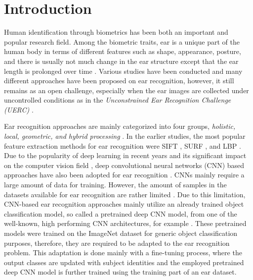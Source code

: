 \documentclass[11pt,journal,compsoc]{IEEEtran}
\begin{document}
\IEEEdisplaynotcompsoctitleabstractindextext

\IEEEpeerreviewmaketitle



\section{Introduction}\label{sec1}
Human identification through biometrics has been both an important and popular research field. 
Among the biometric traits, ear is a unique part of the human body in terms of different features such as shape, appearance, posture, and there is usually not much change in the ear structure except that the ear length is prolonged over time \cite{Emersic_2017_a}. Various studies have been conducted and many different approaches have been proposed on ear recognition, however, it still remains as an open challenge, especially when the ear images are collected under uncontrolled conditions as in the \textit{Unconstrained Ear Recognition Challenge (UERC)} \cite{Emersic_2017_b}.

Ear recognition approaches are mainly categorized into four groups, \textit{holistic, local, geometric, and hybrid processing} \cite{Emersic_2017_a}. In the earlier studies, the most popular feature extraction methods for ear recognition were SIFT \cite{Hurley_2005}, SURF \cite{Prakash_2013}, and LBP \cite{Wang_2011}. Due to the popularity of deep learning in recent years and its significant impact on the computer vision field \cite{Krizhevsky_2012,Simonyan_2014,Szegedy_2015,Iandola_2016,Galdamez_2016}, deep convolutional neural networks (CNN) based approaches have also been adopted for ear recognition \cite{Emersic_2017_b,Emersic_2017_c,Galdamez_2016}. 
CNNs mainly require a large amount of data for training. However, the amount of samples in the datasets available for ear recognition are rather limited \cite{Emersic_2017_a,Emersic_2017_b,Carreira_Perpinan_1995,Kumar_2012,Frejlichowski_2010,Gonzalez_2008}. 
Due to this limitation, CNN-based ear recognition approaches mainly utilize an already trained object classification model, so called a pretrained deep CNN model, from one of the well-known, high performing CNN architectures, for example \cite{Krizhevsky_2012,Simonyan_2014,Szegedy_2015}. These pretrained models were trained on the ImageNet dataset \cite{Deng_2009}
for generic object classification purposes, therefore, they are required to be adapted to the ear recognition problem. This adaptation is done mainly with a fine-tuning process, where the output classes are updated with subject identities and the employed pretrained deep CNN model is further trained using the training part of an ear dataset.
\end{document}
